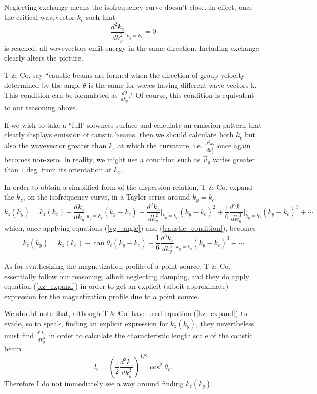 \documentclass{article}
\begin{document}
Neglecting exchange means the isofrequency curve doesn't close. In effect, once the critical wavevector $k_{c}$ such that 
\begin{equation}\label{caustic_condition}
\frac{d^2 k_{z}}{d k_{y}^2} \bigg|_{k_{y} = k_{c}} = 0
\end{equation} 
is reached, all wavevectors emit energy in the same direction. Including exchange clearly alters the picture.

T \& Co. say ``caustic beams are formed when the direction of group velocity determined by the angle $\theta$ is the same for waves having different wave vectors k. This condition can be formulated as $\frac{d \theta}{d k_{y}}$." Of course, this condition is equivalent to our reasoning above.

If we wish to take a ``full" slowness surface and calculate an emission pattern that clearly displays emission of caustic beams, then we should calculate both $k_{c}$ but also the wavevector greater than $k_{c}$ at which the curvature, i.e. $\frac{d^2 k_{z}}{d k_{y}^2}$ once again becomes non-zero. In reality, we might use a condition such as $\vec{v}_{g}$ varies greater than $1 \deg$ from its orientation at $k_{c}$.

In order to obtain a simplified form of the dispersion relation, T \& Co. expand the $k_{z}$, on the isofrequency curve, in a Taylor series around $k_{y} = k_{c}$
\begin{equation}
k_{z} (k_{y} ) = k_{z} (k_{c}) + \frac{d k_{z}}{d k_{y}} \bigg|_{k_{y} = k_{c}} (k_{y} - k_{c}) + \frac{d^2 k_{z}}{d k_{y}^2} \bigg|_{k_{y} = k_{c}}(k_{y} - k_{c})^2 + \frac{1}{6} \frac{d^3 k_{z}}{d k_{y}^3} \bigg|_{k_{y} = k_{c}}(k_{y} - k_{c})^3 + \cdots
\end{equation}
which, once applying equations (\ref{vg_angle}) and (\ref{caustic_condition}), becomes
\begin{equation}\label{kz_expand}
k_{z} (k_{y} ) = k_{z} (k_{c}) - \tan{\theta_{c}} (k_{y} - k_{c}) + \frac{1}{6} \frac{d^3 k_{z}}{d k_{y}^3}\bigg|_{k_{y} = k_{c}} (k_{y} - k_{c})^3 + \cdots
\end{equation}

As for synthesizing the magnetization profile of a point source, T \& Co. essentially follow our reasoning, albeit neglecting damping, and they do apply equation (\ref{kz_expand}) in order to get an explicit (albeit approximate) expression for the magnetization profile due to a point source.

We should note that, although T \& Co. have used equation (\ref{kz_expand}) to evade, so to speak, finding an explicit expression for $k_{z} ( k_{y} )$, they nevertheless must find $\frac{d^3 k_{z}}{d k_{y}^3}$ in order to calculate the characteristic length scale of the caustic beam
\begin{equation}
l_{c} = \left( \frac{1}{2} \frac{d^3 k_{z}}{d k_{y}^3} \right)^{1/2} \cos^2{\theta_{c}}.
\end{equation}
Therefore I do not immediately see a way around finding $k_{z} (k_{y})$.
\end{document}

